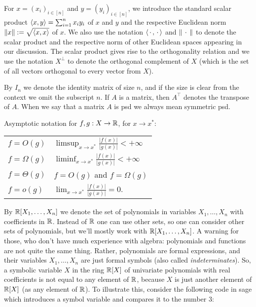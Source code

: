 For $x= (x_i)_{i \in [n]}$ and $y = (y_i)_{i \in [n]}$, we introduce the standard scalar product $\left\langle x , y \right\rangle = \sum_{i=1}^n x_i y_i$ of $x$ and $y$ and the respective Euclidean norm $\|x\| := \sqrt{\left\langle x , x \right\rangle}$ of $x$. We also use the notation $\left\langle \, \cdot \, , \, \cdot \, \right\rangle$ and $\|\, \cdot \,\|$ to denote the scalar product and the respective norm of other Euclidean spaces appearing in our discussion. The scalar product gives rise to the orthogonality relation and we use the notation $X^\perp$ to denote the orthogonal complement of $X$ (which is the set of all vectors orthogonal to every vector from $X$). 

By $I_n$ we denote the identity matrix of size $n$, and if the size is clear from the context we omit the subscript $n$. If $A$ is a matrix, then $A^\top$ denotes the transpose of $A$. When we say that a matrix $A$ is psd we always mean symmetric psd.



Asymptotic notation for $f, g: X \to \mathbb{R}$, for $x \to x^\ast$:

\begin{center}
\begin{tabular}{l@{\hskip 5em}l}
	$f=O(g)$ & $\limsup_{x \to x^\ast} \frac{|f(x)|}{|g(x)|} < +\infty$ 
	\\ $f=\Omega(g)$ & $\liminf_{x \to x^\ast} \frac{|f(x)|}{|g(x)|} < +\infty$ 
	\\ $f = \Theta(g)$ & $f= O(g)$ and $f = \Omega(g)$
	\\ $f = o(g)$ & $\lim_{x \to x^\ast} \frac{|f(x)|}{|g(x)|} = 0$. 
\end{tabular}
\end{center}


By $\mathbb{R}[X_1,\ldots,X_n]$ we denote the set of polynomials in variables $X_1,\ldots,X_n$ with coefficients in $\mathbb{R}$. Instead of $\mathbb{R}$ one can use other sets, so one can consider other sets of polynomials, but we'll mostly work with $\mathbb{R}[X_1,\ldots,X_n]$. A warning for those, who don't have much experience with algebra: polynomials and functions are not quite the same thing. Rather, polynomials are formal expressions, and their variables $X_1,\ldots,X_n$ are just formal symbols (also called \emph{indeterminates}). So, a symbolic variable $X$ in the ring $\mathbb{R}[X]$ of univariate polynomials with real coefficients is not equal to any element of $\mathbb{R}$, because $X$ is just another element of $\mathbb{R}[X]$ (as any element of $\mathbb{R}$). To illustrate this, consider the following code in sage which introduces a symbol variable and compares it to the number $3$: 

